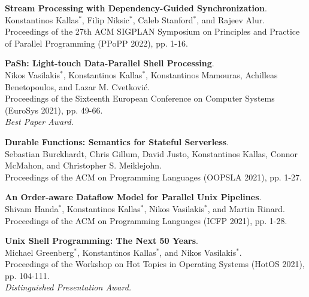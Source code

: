 \begin{minipage}{\textwidth}
\textbf{Stream Processing with Dependency-Guided Synchronization}. \\
Konstantinos Kallas$^*$, Filip Niksic$^*$, Caleb Stanford$^*$, and Rajeev Alur. \\
Proceedings of the 27th ACM SIGPLAN Symposium on Principles and Practice of Parallel Programming (PPoPP 2022), pp. 1-16.
\end{minipage}

\begin{minipage}{\textwidth}
\textbf{PaSh: Light-touch Data-Parallel Shell Processing}. \\
Nikos Vasilakis$^*$, Konstantinos Kallas$^*$, Konstantinos Mamouras, Achilleas Benetopoulos, and Lazar M. Cvetković. \\
Proceedings of the Sixteenth European Conference on Computer Systems (EuroSys 2021), pp. 49-66.\\
    \emph{Best Paper Award.}
\end{minipage}

\begin{minipage}{\textwidth}
\textbf{Durable Functions: Semantics for Stateful Serverless}. \\
Sebastian Burckhardt, Chris Gillum, David Justo, Konstantinos Kallas, Connor McMahon, and Christopher S. Meiklejohn. \\
Proceedings of the ACM on Programming Languages (OOPSLA 2021), pp. 1-27.
\end{minipage}

\begin{minipage}{\textwidth}
\textbf{An Order-aware Dataflow Model for Parallel Unix Pipelines}. \\
Shivam Handa$^*$, Konstantinos Kallas$^*$, Nikos Vasilakis$^*$, and Martin Rinard. \\
Proceedings of the ACM on Programming Languages (ICFP 2021), pp. 1-28.
\end{minipage}    

\begin{minipage}{\textwidth}
\textbf{Unix Shell Programming: The Next 50 Years}. \\
Michael Greenberg$^*$, Konstantinos Kallas$^*$, and Nikos Vasilakis$^*$. \\
Proceedings of the Workshop on Hot Topics in Operating Systems (HotOS 2021), pp. 104-111. \\
    \emph{Distinguished Presentation Award.}
\end{minipage}

